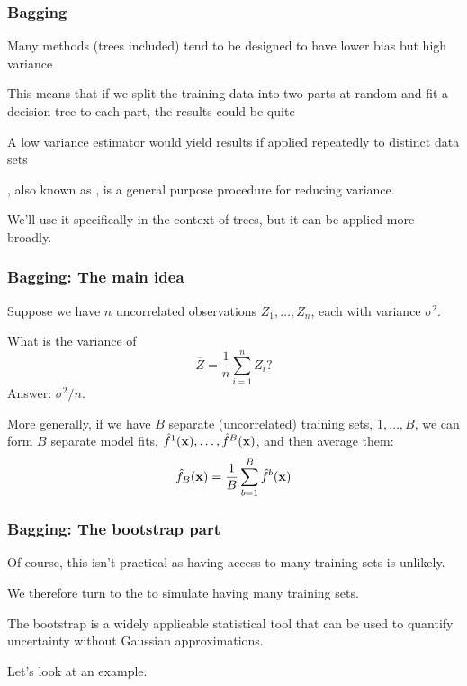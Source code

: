 \documentclass[12pt]{beamer}
\begin{document}
\begin{frame}[fragile]
\frametitle{Bagging}
Many methods (trees included) tend to be designed to have lower bias but high variance

\vsp
This means
that if we split the training data into two parts at random and fit a decision tree to each part, the results could be quite 

\vsp
A low variance estimator would yield  results if applied repeatedly to distinct data sets 


\vsp
{}, also known as , is a general purpose procedure for reducing variance. 

\vsp
We'll use it specifically in the context of trees, but it can be applied more broadly.
\end{frame}

\begin{frame}[fragile]
\frametitle{Bagging: The main idea}
Suppose we have $n$ uncorrelated observations $Z_1, \ldots, Z_n$, each with variance $\sigma^2$.

\vsp
What is the variance of
\[
\overline{Z} = \frac{1}{n} \sum_{i=1}^n Z_i?
\]
\pause
Answer: $\sigma^2/n$.

\vsp
More generally, if we have $B$ separate (uncorrelated) training sets, $1, \ldots, B$, we can form $B$ separate model fits, 
$\hat f^1(\mathbf{x}), \ldots, \hat f^B(\mathbf{x})$, and then average them:
\[
\hat f_{B}(\mathbf{x}) = \frac{1}{B} \sum_{b=1}^B \hat f^b(\mathbf{x})
\]
\end{frame}

\begin{frame}[fragile]
\frametitle{Bagging: The bootstrap part}
Of course, this isn't practical as having access to many training sets is unlikely.  

\vsp

We therefore
turn to the  to simulate having many training sets.

\vsp
The bootstrap is a widely applicable statistical tool that can be used to quantify uncertainty without Gaussian approximations.

\vsp
Let's look at an example.
\end{frame}

\begin{frame}
      \begin{center}
      \end{center}
\end{frame}
\end{document}
